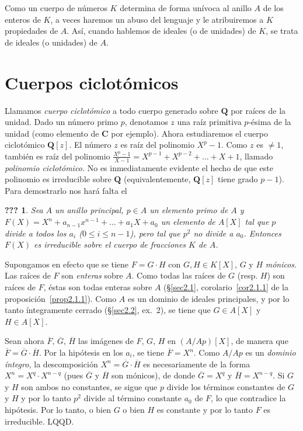 \documentclass[bibtotoc,leqno,spanish]{amsbook}
\newcommand{\QQ}{\mathbf{Q}}
\newcommand{\CC}{\mathbf{C}}
\newcommand{\QED}{LQQD.}
\newcommand{\oline}[1]{\overline{#1}}
\numberwithin{equation}{section}
\theoremstyle{note}
\theoremstyle{note}
\newcommand{\namedname}{???}
\newtheorem*{namedthm}{\namedname}
\newenvironment{named}[1]%
	{\renewcommand{\namedname}{#1}%
	\begin{namedthm}}%
	{\end{namedthm}}
\theoremstyle{rem}
\numberwithin{theorem}{section}
\numberwithin{proposition}{section}
\numberwithin{definition}{section}
\numberwithin{lemma}{section}
\numberwithin{corollary}{section}
\numberwithin{example}{section}
\numberwithin{footnote}{section}%
\begin{document}
Como un cuerpo de n\'umeros $K$ determina de forma un\'ivoca al anillo $A$ de los enteros de $K$, a veces
haremos un abuso del lenguaje y le atribuiremos a $K$ propiedades de $A$. As\'i, cuando hablemos
de ideales (o de unidades) de $K$, se trata de ideales (o unidades) de $A$.

\section{Cuerpos ciclot\'omicos}\label{sec2.9}

Llamamos {\em cuerpo ciclot\'omico} a todo cuerpo generado sobre $\QQ$ por ra\'ices de la unidad. Dado
un n\'umero primo $p$, denotamos $z$ una ra\'iz primitiva $p$-\'esima de la unidad (como elemento
de $\CC$ por ejemplo). Ahora estudiaremos el cuerpo ciclot\'omico $\QQ[z]$.
El n\'umero $z$ es ra\'iz del polinomio $X^{p}-1$. Como $z$ es $\neq 1$, tambi\'en es ra\'iz del polinomio
$\frac{X^{p}-1}{X-1} = X^{p-1}+X^{p-2}+\dots+X+1$, llamado {\em polinomio ciclot\'omico.} No es inmediatamente
evidente el hecho de que este polinomio es irreducible sobre $\QQ$ (equivalentemente, $\QQ[z]$ tiene
grado $p-1$). Para demostrarlo nos har\'a falta el

\begin{named}{Criterio de Eisenstein}
Sea $A$ un anillo principal, $p\in A$ un elemento primo de $A$ y $F(X) = X^{n}+a_{n-1}x^{n-1}+\dots+a_{1}X+a_{0}$
un elemento de $A[X]$ tal que $p$ divide a todos los $a_{i}$ ($0\leq i\leq n-1${\upshape),} pero tal que $p^{2}$ no
divide a $a_{0}$. Entonces $F(X)$ es irreducible sobre el cuerpo de fracciones $K$ de $A$.
\end{named}

Supongamos en efecto que se tiene $F = G\cdot H$ con $G, H\in K[X]$, $G$ y $H$ {\em m\'onicos.} Las
ra\'ices de $F$ son {\em enteras} sobre $A$. Como todas las ra\'ices de $G$ (resp. $H$) son ra\'ices de $F$, \'estas
son todas enteras sobre $A$ (\S\ref{sec2.1}, corolario~\ref{cor2.1.1} de la proposici\'on~\ref{prop2.1.1}). Como $A$ es un dominio de ideales principales, y por
lo tanto \'integramente cerrado (\S\ref{sec2.2}, ex.~2), se tiene que $G\in A[X]$ y $H\in A[X]$.

Sean ahora $\oline F$, $\oline G$, $\oline H$ las im\'agenes de $F$, $G$, $H$ en $(A/Ap)[X]$, de manera que
$\oline F = \oline G\cdot\oline H$. Por la hip\'otesis en los $a_{i}$, se tiene $\oline F = X^{n}$.
Como $A/Ap$ es un {\em dominio \'integro,} la descomposici\'on $X^{n}=\oline G\cdot\oline H$ es necesariamente
de la forma $X^{n}=X^{q}\cdot X^{n-q}$ (pues $\oline G$ y $\oline H$ son m\'onicos), de donde
$\oline G = X^{q}$ y $\oline H = X^{n-q}$. Si $G$ y $H$ son ambos no constantes, se sigue que
$p$ divide los t\'erminos constantes de $G$ y $H$ y por lo tanto $p^{2}$ divide al t\'ermino constante
$a_{0}$ de $F$, lo que contradice la hip\'otesis. Por lo tanto, o bien $G$ o bien $H$ es constante y por
lo tanto $F$ es irreducible. \QED
\end{document}
